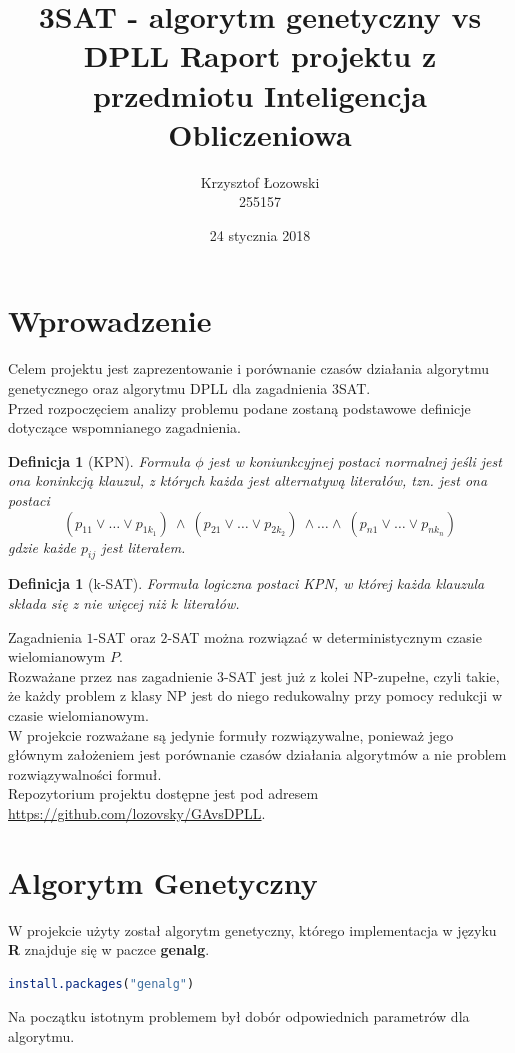 \documentclass[11pt]{article}
\title{\textbf{3SAT - algorytm genetyczny vs DPLL}
\large Raport projektu z przedmiotu Inteligencja Obliczeniowa}
\author{Krzysztof Łozowski \\ 255157}
\date{24 stycznia 2018}
\theoremstyle{note}
\newtheorem{definition}[theorem]{Definicja}
\begin{document}
\maketitle

\section{Wprowadzenie}
Celem projektu jest zaprezentowanie i porównanie czasów działania algorytmu genetycznego oraz algorytmu DPLL dla zagadnienia 3SAT. \\
Przed rozpoczęciem analizy problemu podane zostaną podstawowe definicje dotyczące wspomnianego zagadnienia.

\begin{definition}[KPN]
Formuła $\phi$ jest w koniunkcyjnej postaci normalnej jeśli jest ona koninkcją klauzul, z których każda jest alternatywą literałów, tzn. jest ona postaci
  \begin{displaymath}
    (p_{11} \vee \ldots \vee p_{1k_{1}}) \ \wedge \ (p_{21} \vee \ldots \vee p_{2k_{2}}) \ \wedge \ldots \wedge \ (p_{n1} \vee \ldots \vee p_{nk_{n}})
  \end{displaymath}
gdzie każde $p_{ij}$ jest literałem.
\end{definition}

\begin{definition}[k-SAT]
  Formuła logiczna postaci KPN, w której każda klauzula składa się z nie więcej niż $k$ literałów.
\end{definition}

\noindent Zagadnienia $1$-SAT oraz $2$-SAT można rozwiązać w deterministycznym czasie wielomianowym $P$. \\
Rozważane przez nas zagadnienie $3$-SAT jest już z kolei NP-zupełne, czyli takie, że każdy problem z klasy NP jest do niego redukowalny przy pomocy redukcji w czasie wielomianowym. \\
W projekcie rozważane są jedynie formuły rozwiązywalne, ponieważ jego głównym założeniem jest porównanie czasów działania algorytmów a nie problem rozwiązywalności formuł. \\

\noindent
Repozytorium projektu dostępne jest pod adresem \\\url{https://github.com/lozovsky/GAvsDPLL}.


\newpage
\section{Algorytm Genetyczny}
W projekcie użyty został algorytm genetyczny, którego implementacja w języku \textbf{R} znajduje się w paczce \textbf{genalg}.
\begin{lstlisting}[language=R]
	install.packages("genalg")
\end{lstlisting}
Na początku istotnym problemem był dobór odpowiednich parametrów dla algorytmu. 
\end{document}
